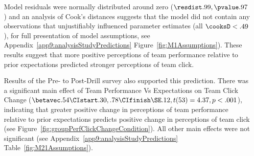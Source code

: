 \begin{CJK}{UTF8}{gbsn}
Model residuals were normally distributed around zero ($\resdist .99, \pvalue .97$) and an analysis of Cook's distances suggests that the model did not contain any observations that unjustifiably influenced parameter estimates (all $\cooksD < .49$), for full presentation of model assumptions, see Appendix~\ref{app9:analysisStudyPredictions} Figure~\ref{fig:M1Assumptions}).  These results suggest that more positive perceptions of team performance relative to prior expectations predicted stronger perceptions of team click.


Results of the Pre- to Post-Drill survey also supported this prediction.  There was a significant main effect of Team Performance Vs Expectations on Team Click Change ($\betavec .54 \CIstart .30, .78 \CIfinish \SE .12, t(53) = 4.37, p < .001$), indicating that greater positive change in perceptions of team performance relative to prior expectations predicts positive change in perceptions of team click (see Figure~\ref{fig:groupPerfClickChangeCondition}).  All other main effects were not significant (see Appendix~\ref{app9:analysisStudyPredictions} Table~\ref{fig:M21Assumptions}).





\end{CJK}
